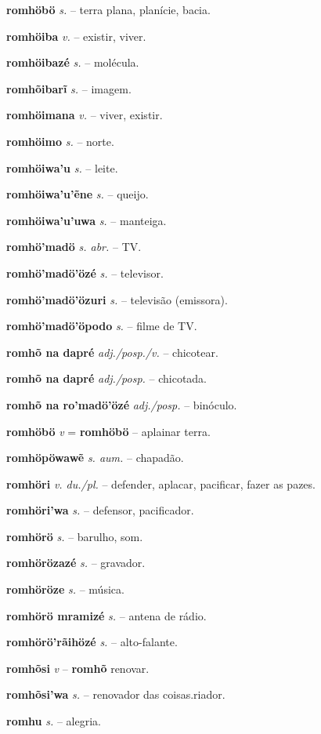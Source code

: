 \textbf{romhöbö} \textit{s.} -- terra plana, planície, bacia.

\textbf{romhöiba} \textit{v.} -- existir, viver.

\textbf{romhöibazé} \textit{s.} -- molécula.

\textbf{romhõibarĩ} \textit{s.} -- imagem.

\textbf{romhöimana} \textit{v.} -- viver, existir.

\textbf{romhöimo} \textit{s.} -- norte.

\textbf{romhöiwa'u} \textit{s.} -- leite.

\textbf{romhöiwa'u'ẽne} \textit{s.} -- queijo.

\textbf{romhöiwa'u'uwa} \textit{s.} -- manteiga.

\textbf{romhö'madö} \textit{s. abr.} -- TV.

\textbf{romhö'madö'özé} \textit{s.} -- televisor.

\textbf{romhö'madö'özuri} \textit{s.} -- televisão (emissora).

\textbf{romhö'madö'öpodo} \textit{s.} -- filme de TV.

\textbf{romhõ na dapré} \textit{adj./posp./v.} -- chicotear.

\textbf{romhõ na dapré} \textit{adj./posp.} -- chicotada.

\textbf{romhõ na ro'madö'özé} \textit{adj./posp.} -- binóculo.

\textbf{romhöbö} \textit{v} = \textbf{romhöbö} -- aplainar terra.

\textbf{romhöpöwawẽ} \textit{s. aum.} -- chapadão.

\textbf{romhöri} \textit{v. du./pl.} -- defender, aplacar, pacificar, fazer as pazes.

\textbf{romhöri'wa} \textit{s.} -- defensor, pacificador.

\textbf{romhörö} \textit{s.} -- barulho, som.

\textbf{romhörözazé} \textit{s.} -- gravador.

\textbf{romhöröze} \textit{s.} -- música.

\textbf{romhörö mramizé} \textit{s.} -- antena de rádio.

\textbf{romhörö'rãihözé} \textit{s.} -- alto-falante.

\textbf{romhõsi} \textit{v} -- \textbf{romhõ} renovar.

\textbf{romhõsi'wa} \textit{s.} -- renovador das coisas.riador.

\textbf{romhu} \textit{s.} -- alegria.

